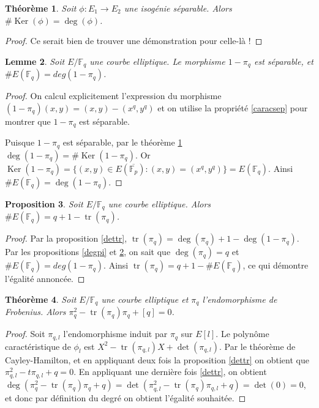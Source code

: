 \documentclass{article}
\theoremstyle{plain}%
\newtheorem{thm}{Théorème}[section]
\newtheorem{prop}[thm]{Proposition}
\newtheorem{lem}[thm]{Lemme}
\theoremstyle{definition}%
\newcommand{\F}{\mathbb{F}}
\DeclareMathOperator{\tr}{tr}
\DeclareMathOperator{\Ker}{Ker}
\begin{document}
\begin{thm}
  \label{cardinal_noyau}
  Soit $\phi:E_1\to E_2$ une isogénie séparable. Alors $\# \Ker(\phi) = \deg(\phi)$.  
\end{thm}

\begin{proof}
  {\color{red} Ce serait bien de trouver une démonstration pour celle-là !}
\end{proof}

\begin{lem}
  \label{cardpi}
  Soit $E/\F_q$ une courbe elliptique. Le morphisme $1-\pi_q$ est séparable, et $\#E(\F_q) = deg(1 - \pi_q)$.
\end{lem}

\begin{proof}
  On calcul explicitement l'expression du morphisme $(1-\pi_q)(x, y) = (x, y) - (x^q, y^q)$ et on utilise la propriété \ref{caracsep} pour montrer que $1-\pi_q$ est séparable.

  Puisque $1-\pi_q$ est séparable, par le théorème \ref{cardinal_noyau} $\deg(1-\pi_q) = \# \Ker(1-\pi_q)$. Or $\Ker(1-\pi_q) = \{(x, y) \in E(\overline{\F_p}) : (x, y) = (x^q, y^q) \} = E(\F_q)$. Ainsi $\# E(\F_q) = \deg(1-\pi_q)$.
\end{proof}

\begin{prop}
  Soit $E/\F_q$ une courbe elliptique. Alors $\# E(\F_q) = q+1-\tr(\pi_q)$.
\end{prop}

\begin{proof}
  Par la proposition \ref{dettr}, $\tr(\pi_q) = \deg(\pi_q) + 1 - \deg(1-\pi_q)$. Par les propositions \ref{degpi} et \ref{cardpi}, on sait que $\deg(\pi_q) = q$ et $\#E(\F_q) = deg(1 - \pi_q)$. Ainsi $\tr(\pi_q) = q + 1 - \#E(\F_q)$, ce qui démontre l'égalité annoncée.
\end{proof}

\begin{thm}
  \label{polcarac}
  Soit $E/\F_q$ une courbe elliptique et $\pi_q$ l'endomorphisme de Frobenius. Alors $\pi_q^2 -\tr(\pi_q)\pi_q + [q] = 0$.
\end{thm}

\begin{proof}
  Soit $\pi_{q, l}$ l'endomorphisme induit par $\pi_q$ sur $E[l]$. Le polynôme caractéristique de $\phi_l$ est $X^2 -\tr(\pi_{q,l}) X + \det(\pi_{q, l})$. Par le théorème de Cayley-Hamilton, et en appliquant deux fois la proposition \ref{dettr} on obtient que $\pi_{q,l}^2 - t\pi_{q,l}+q = 0$. En appliquant une dernière fois \ref{dettr}, on obtient $\deg(\pi_{q}^2 - \tr(\pi_q)\pi_{q}+q ) = \det (\pi_{q,l}^2 - \tr(\pi_q)\pi_{q,l}+q ) = \det(0) = 0$, et donc par définition du degré on obtient l'égalité souhaitée.
\end{proof}
\end{document}
